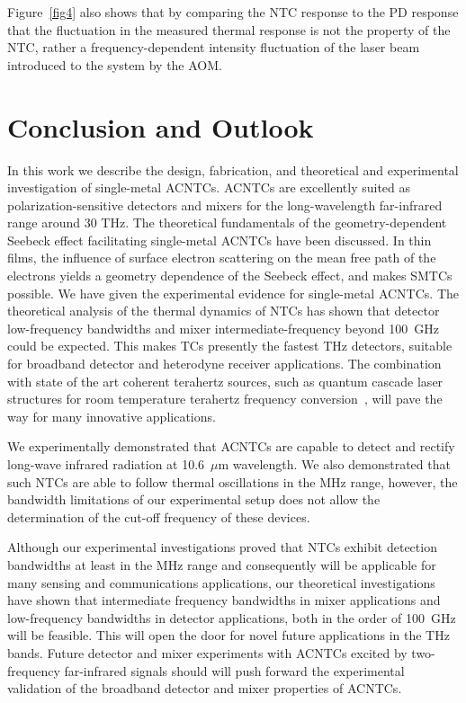 \documentclass[journal]{IEEEtran}
\begin{document}
Figure~\ref{fig4} also shows that by comparing the NTC response to the PD response that the fluctuation in the measured thermal response is not the property of the NTC, rather a frequency-dependent intensity fluctuation of the laser beam introduced to the system by the AOM.

%
%
\section{Conclusion and Outlook}
%
%
In this work we describe the design, fabrication, and theoretical and experimental investigation of single-metal ACNTCs. ACNTCs are excellently suited as polarization-sensitive detectors and mixers for the long-wavelength far-infrared range around 30 THz. The theoretical fundamentals of the geometry-dependent Seebeck effect facilitating single-metal ACNTCs have been discussed.  In thin films, the influence of surface electron scattering on the mean free path of the electrons yields a geometry dependence of the Seebeck effect, and makes SMTCs possible. We have given the experimental evidence for single-metal ACNTCs. The theoretical analysis of the thermal dynamics of NTCs has shown that detector low-frequency bandwidths and mixer intermediate-frequency beyond 100~GHz could be expected. This makes TCs presently the fastest THz detectors, suitable for broadband detector and heterodyne receiver applications. The combination with state of the art coherent terahertz sources, such as quantum cascade laser structures for room temperature terahertz frequency conversion~\cite{vijayraghavan2013broadly, jirauschek2013monte,lu2014continuous}, will pave the way for many innovative applications.

We experimentally demonstrated that ACNTCs are capable to detect and rectify long-wave infrared radiation at 10.6~$\mu$m wavelength. We also demonstrated that such NTCs are able to follow thermal oscillations in the MHz range, however, the bandwidth limitations of our experimental setup does not allow the determination of the cut-off frequency of these devices. 

Although our experimental investigations proved that NTCs exhibit detection bandwidths at least in the MHz range and consequently will be applicable for many sensing and communications applications, our theoretical investigations have shown that intermediate frequency bandwidths in mixer applications and low-frequency bandwidths in detector applications, both in the order of 100~GHz will be feasible. This will open the door for novel future applications in the THz bands. Future detector and mixer experiments with ACNTCs excited by two-frequency far-infrared signals should will push forward the experimental validation of the broadband detector and mixer properties of ACNTCs.
\end{document}
